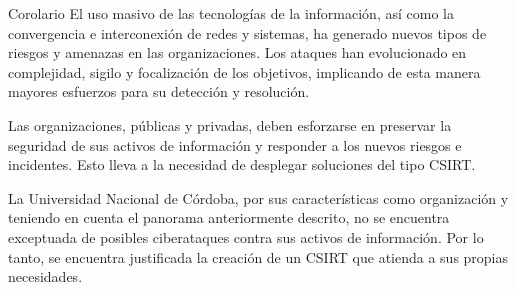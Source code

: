     \begin{section}{Corolario}
    El uso masivo de las tecnologías de la información, así como la convergencia e interconexión de redes y sistemas, ha generado nuevos tipos de riesgos y amenazas en las organizaciones. Los ataques han evolucionado en complejidad, sigilo y focalización de los objetivos, implicando de esta manera mayores esfuerzos para su detección y resolución. \par
	Las organizaciones, públicas y privadas, deben esforzarse en preservar la seguridad de sus activos de información y responder a los nuevos riesgos e incidentes. Esto lleva a la necesidad de desplegar soluciones del tipo CSIRT. \par
    La Universidad Nacional de Córdoba, por sus características como organización y teniendo en cuenta el panorama anteriormente descrito, no se encuentra exceptuada de posibles ciberataques contra sus activos de información. Por lo tanto, se encuentra justificada la creación de un CSIRT que atienda a sus propias necesidades. \par

    \end{section}
            
            
            
            
